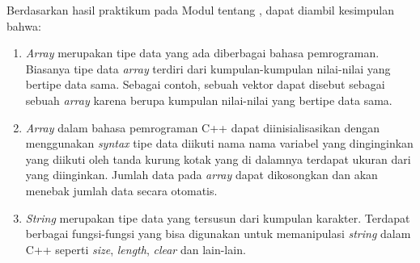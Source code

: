 \documentclass{subfiles}
\begin{document}
    Berdasarkan hasil praktikum pada Modul {} tentang {\leftmark}, dapat diambil kesimpulan bahwa:
    \begin{enumerate}
        \item {
            \textit{Array} merupakan tipe data yang ada diberbagai bahasa pemrograman. Biasanya tipe data \textit{array} terdiri dari kumpulan-kumpulan nilai-nilai yang bertipe data sama. Sebagai contoh, sebuah vektor dapat disebut sebagai sebuah \textit{array} karena berupa kumpulan nilai-nilai yang bertipe data sama.
        }
        \item {
            \textit{Array} dalam bahasa pemrograman C++ dapat diinisialisasikan dengan menggunakan \textit{syntax} tipe data diikuti nama nama variabel yang dinginginkan yang diikuti oleh tanda kurung kotak yang di dalamnya terdapat ukuran dari {\sarray} yang diinginkan. Jumlah data pada \textit{array} dapat dikosongkan dan {\compiler} akan menebak jumlah data secara otomatis.
        }
        \item {
            \textit{String} merupakan tipe data yang tersusun dari kumpulan karakter. Terdapat berbagai fungsi-fungsi yang bisa digunakan untuk memanipulasi \textit{string} dalam C++ seperti \textit{size}, \textit{length}, \textit{clear} dan lain-lain.
        }
    \end{enumerate}
\end{document}
